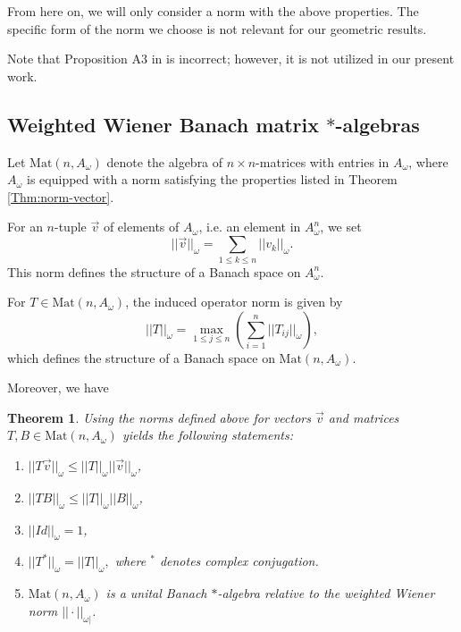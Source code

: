 \documentclass[a4paper,11pt]{amsart}
\newtheorem{theorem}{Theorem}[section]
\theoremstyle{definition}
\numberwithin{equation}{section}
\begin{document}
From here on, we will only consider a norm with the above properties. The specific form of the norm we choose is not relevant for our geometric results.

Note that Proposition A3 in \cite{GoWa} is incorrect; however, it is not utilized in our present work.


\subsection{Weighted Wiener Banach matrix $*$-algebras}\label{sec:6.8}

Let $\mathrm{Mat}(n, A_\omega)$ denote the algebra of $n \times n$-matrices with entries in $A_\omega$, where 
 $A_\omega$ is equipped with a norm satisfying the properties listed in Theorem \ref{Thm:norm-vector}.
  
 For an $n$-tuple $\vec{v}$ of elements of  $A_\omega$, i.e. an element  in $A_\omega^n$,
 we set
$$ ||\vec{v}||_\omega  =  \sum_{1 \leq k \leq n} ||v_k||_\omega.$$
This norm defines the structure of a Banach space on $A_\omega^n$.

For $T \in \mathrm{Mat}(n, A_\omega)$,  the induced operator norm is given by \begin{equation}\label{eq: T-norm}
 || T||_\omega = \max_{1 \leq j \leq n} ( \sum_{i = 1}^n ||T_{ij}||_\omega),
 \end{equation}
which defines the structure of a Banach space on $\mathrm{Mat}(n, A_\omega).$

Moreover, we have
\begin{theorem} Using the norms defined above for vectors $\vec{v}$ and matrices $T, B \in \mathrm{Mat}(n, A_\omega)$
yields the following statements:
\begin{enumerate}
\item  $ || T \vec{v}||_\omega \leq  || T||_\omega  || \vec{v}||_\omega$,
\item  $|| TB||_\omega \leq  || T||_\omega  || B||_\omega$,
\item  $|| Id ||_\omega = 1$,
\item $ ||T^*||_\omega = ||T||_\omega,$ where $^*$ denotes complex conjugation.
\item $\mathrm{Mat}(n, A_\omega)$  is a unital 
Banach $*$-algebra relative to the weighted Wiener norm $||\cdot ||_{\omega|}$.
\end{enumerate}
\end{theorem}
\end{document}
